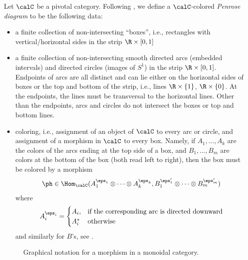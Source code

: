 Let $\calC$ be a pivotal category. Following , we
define a $\calC$-colored \emph{Penrose diagram} to be the following data:
\begin{itemize}
  \item a finite collection of non-intersecting ``boxes'', i.e., rectangles
  with vertical/horizontal sides in the strip $\R\times [0,1]$
  \item a finite collection of non-intersecting smooth directed arcs (embedded
  intervals) and directed circles (images of $S^1$) in the strip $\R\times
  [0,1]$. Endpoints of arcs are all distinct and can lie
  either on the horizontal sides of boxes or the top and bottom of the strip,
  i.e., lines $\R\times\{1\}$, $\R\times \{0\}$. At the endpoints, the lines
  must be transversal to the horizontal lines. Other than the endpoints, arcs
  and circles do not intersect the boxes or top and bottom lines.
  \item coloring, i.e., assignment of an object of $\calC$ to every arc or
  circle, and assignment of a morphism in $\calC$ to every box. Namely, if
  $A_1, \dots, A_k$ are the colors of the arcs ending at the top side of a box,
  and $B_1, \dots, B_m$ are colors at the bottom of the box (both read left to
  right), then the box must be colored by a morphism
  $$
    \ph\in \Hom_\calC(
      A_1^{\eps_1}\otimes\dots\otimes A_k^{\eps_k},
      B_1^{\eps'_1}\otimes\dots\otimes B_m^{\eps'_m}
    )
  $$
  where
  \begin{equation}\label{e:signed-object}
    A_i^{\eps_i} =\begin{cases}
                 A_i, & \text{if the corresponding arc is directed downward}\\
                 A_i^* &\text{otherwise}
                 \end{cases}
  \end{equation}
  and similarly for $B$'s, see .
\end{itemize}
\begin{figure}[h]
  \centering
  \caption{Graphical notation for a morphism in a monoidal category.}
  \label{f:graphical-morphism2}
\end{figure}

